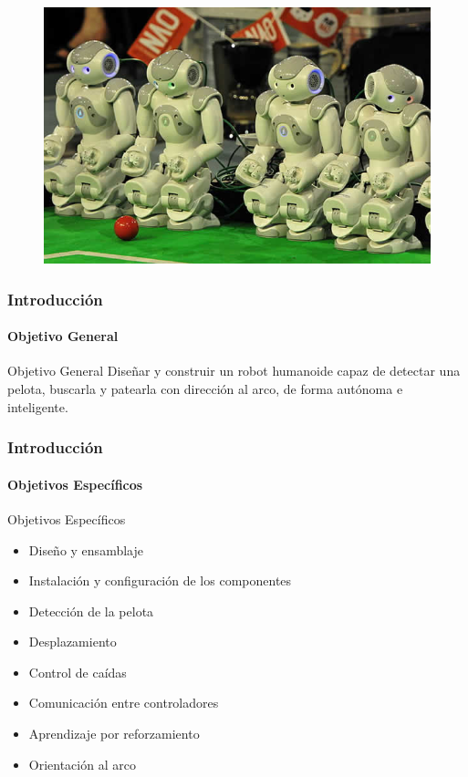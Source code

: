 \documentclass{beamer}
\begin{document}
\begin{frame}
\begin{figure}
\includegraphics[scale=0.5]{13-06-28-robocup-eindhoven.jpg} 

\end{figure}
\end{frame}


\begin{frame}
  \frametitle{Introducci\'{o}n}
  \framesubtitle{Objetivo General}

  \begin{block}{Objetivo General}
	Dise\~nar y construir un robot humanoide capaz de detectar una pelota, buscarla y patearla con direcci\'on al arco, de forma aut\'onoma e inteligente.
   \end{block}
\end{frame}
\begin{frame}
  \frametitle{Introducci\'{o}n}
  \framesubtitle{Objetivos Espec\'{i}ficos}
  \begin{block}{Objetivos Espec\'{i}ficos}
  \begin{itemize}
    \item Dise\~no y ensamblaje
    \item Instalaci\'on y configuraci\'on de los componentes 
    \item Detecci\'on de la pelota
    \item Desplazamiento 
    \item Control de ca\'idas
    \item Comunicaci\'on entre controladores
    \item Aprendizaje por reforzamiento 
    \item Orientaci\'on al arco 
    \end{itemize}
  \end{block}
\end{frame}
\end{document}
